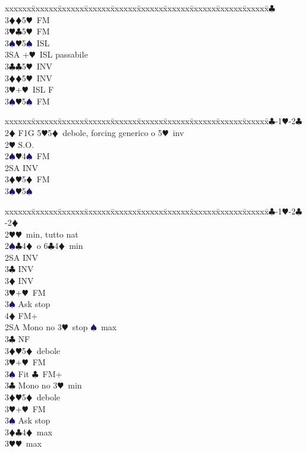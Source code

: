 \documentclass[a4paper,italian]{article}
\newcommand{\BC}{\textcolor{OliveGreen}{$\clubsuit$}}
\newcommand{\BD}{\textcolor{RedOrange}{$\vardiamondsuit$}}
\newcommand{\BH}{\textcolor{Red2}{$\varheartsuit${}}}
\newcommand{\BS}{\textcolor{MidnightBlue}{$\spadesuit${}}}
\newenvironment{bidtable}
{\begin{tabbing}

    xxxxxx\=xxxxxx\=xxxxxx\=xxxxxx\=xxxxxx\=xxxxxx\=xxxxxx\=xxxxxx\=xxxxxx\=xxxxxx\=\kill}
{\end{tabbing} }%
\begin{document}
\begin{multicols}{2}
\begin{bidtable}
        3\BC\+\\
        3\BD {}\BD 5\BH\ FM\\
        3\BH {}\BC 5\BH\ FM\\
        3\BS {}\BH 5\BS\ ISL\\
        3SA +\BH\ ISL passabile\-\-\\
        3\BC {}\BC 5\BH\ INV\\
        3\BD {}\BD 5\BH\ INV\\
        3\BH {}+\BH\ ISL F\\
        3\BS {}\BH 5\BS\ FM\-
    \end{bidtable}
    \bigbreak
    \begin{bidtable}
        1\BC-1\BH-2\BC\+\\
        2\BD \> F1G 5\BH 5\BD\ debole, forcing generico o 5\BH\ inv\\
        2\BH \> S.O.\\
        2\BS {}\BH 4\BS\ FM\\
        2SA \> INV\\
        3\BD {}\BH 5\BD\ FM\\
        3\BS {}\BH 5\BS \-
    \end{bidtable}
    \bigbreak
    \begin{bidtable}
        1\BC-1\BH-2\BC-2\BD\+\\
        2\BH {}\BH\ min, tutto nat\\
        2\BS {}\BC 4\BD\ o 6\BC 4\BD\ min\+\\
        2SA \> INV\\
        3\BC \> INV\\
        3\BD \> INV\\
        3\BH {}+\BH\ FM\\
        3\BS \> Ask stop\\
        4\BD \> FM+\-\\
        2SA \> Mono no 3\BH\ stop \BS\ max\+\\
        3\BC \> NF\\
        3\BD {}\BH 5\BD\ debole\\
        3\BH {}+\BH\ FM\\
        3\BS \> Fit \BC\ FM+\-\\
        3\BC \> Mono no 3\BH\ min\+\\
        3\BD {}\BH 5\BD\ debole\\
        3\BH {}+\BH\ FM\\
        3\BS \> Ask stop\-\\
        3\BD {}\BC 4\BD\ max\\
        3\BH {}\BH\ max\-
    \end{bidtable}


\end{multicols}
\end{document}
